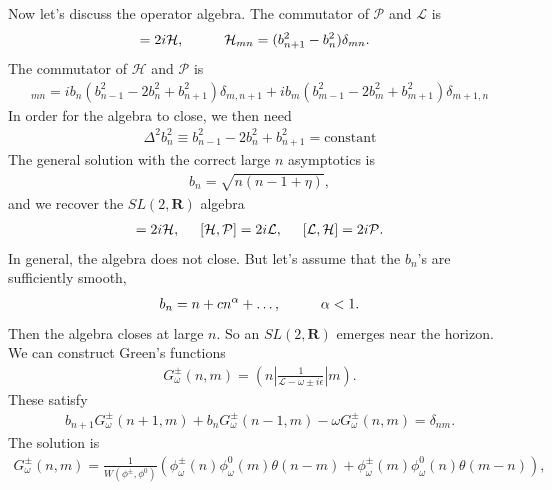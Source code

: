 \documentclass[JHEP,12pt]{article}
\begin{document}
\indent Now let's discuss the operator algebra. The commutator of $\mathcal{P}$ and $\mathcal{L}$ is 
\begin{align}
[\mathcal{L},\mathcal{P}]&=2i\mathcal{H},\hspace{10 mm}\mathcal{H}_{mn}=(b_{n+1}^2-b_{n}^2)\delta_{mn}.
\end{align}
The commutator of $\mathcal{H}$ and $\mathcal{P}$ is
\begin{align}
[\mathcal{H},\mathcal{P}]_{mn}=ib_n(b_{n-1}^2-2b_{n}^2+b_{n+1}^2)\delta_{m,n+1}+ib_m(b_{m-1}^2-2b_{m}^2+b_{m+1}^2)\delta_{m+1,n}
\end{align}
In order for the algebra to close, we then need
\begin{align}
\Delta^2 b_n^2\equiv b_{n-1}^{2}-2b_n^2+b_{n+1}^2=\text{constant}
\end{align}
The general solution with the correct large $n$ asymptotics is  
\begin{align}
b_n=\sqrt{n(n-1+\eta)},
\end{align}
and we recover the $SL(2,\mathbf{R})$ algebra 
\begin{align}
[\mathcal{L},\mathcal{P}]=2i\mathcal{H},\hspace{5 mm}[\mathcal{H},\mathcal{P}]=2i\mathcal{L},\hspace{5 mm}[\mathcal{L},\mathcal{H}]=2i\mathcal{P}.
\end{align}
In general, the algebra does not close. But let's assume that the $b_n$'s are sufficiently smooth,
\begin{align}
b_n=n+cn^{\alpha}+\ldots,\hspace{10 mm}\alpha<1.
\end{align}
Then the algebra closes at large $n$. So an $SL(2,\mathbf{R})$ emerges near the horizon.\\
\indent We can construct Green's functions
\begin{align}
G^{\pm}_\omega(n,m)=\left(n\left|\frac{1}{\mathcal{L}-\omega\pm i \epsilon}\right|m\right).
\end{align}
These satisfy
\begin{align}
b_{n+1}G^{\pm}_\omega(n+1,m)+b_n G^{\pm}_\omega(n-1,m)-\omega G^{\pm}_\omega(n,m)=\delta_{nm}.
\end{align}
The solution is 
\begin{align}
G^{\pm}_\omega(n,m)=\frac{1}{W(\phi^{\pm},\phi^{0})}(\phi^{\pm}_\omega(n)\phi^0_\omega(m)\theta(n-m)+\phi^\pm_\omega(m)\phi^0_\omega(n)\theta(m-n)),
\end{align}
\end{document}
